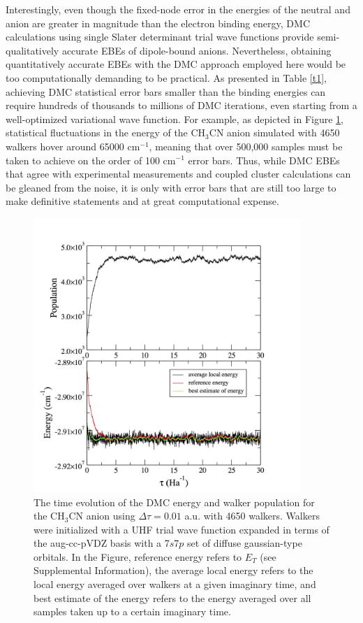 Interestingly, even though the fixed-node error in the energies of the neutral and anion are greater in magnitude than the electron binding energy, DMC calculations using  single Slater determinant trial wave functions provide semi-qualitatively accurate EBEs of dipole-bound anions. Nevertheless, obtaining quantitatively accurate EBEs with the DMC approach employed here would be too computationally demanding to be practical. As presented in Table \ref{t1}, achieving DMC statistical error bars smaller than the binding energies can require hundreds of thousands to millions of DMC iterations, even starting from a well-optimized variational wave function. For example, as depicted in Figure \ref{f2}, statistical fluctuations in the energy of the CH$_{3}$CN anion simulated with 4650 walkers hover around 65000 cm$^{-1}$, meaning that over 500,000 samples must be taken to achieve on the order of 100 cm$^{-1}$ error bars. Thus, while DMC EBEs that agree with experimental measurements and coupled cluster calculations can be gleaned from the noise, it is only with error bars that are still too large to make definitive statements and at great computational expense.
\begin{center}
\begin{figure}[htbp]
\includegraphics[width=0.9\textwidth]{Images/chapter2/DMC-4.pdf}
\caption{The time evolution of the DMC energy and walker population for the CH$_{3}$CN anion using $\Delta \tau = 0.01$ a.u. with 4650 walkers. Walkers were initialized with a UHF trial wave function expanded in terms of the aug-cc-pVDZ basis with a 7$s$7$p$ set of diffuse gaussian-type orbitals. In the Figure, reference energy refers to $E_{T}$ (see Supplemental Information), the average local energy refers to the local energy averaged over walkers at a given imaginary time, and best estimate of the energy refers to the energy averaged over all samples taken up to a certain imaginary time.}
\label{f2}
\end{figure}
\end{center}
